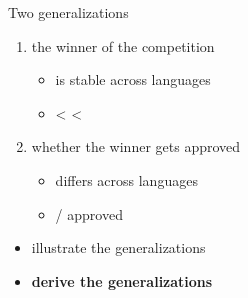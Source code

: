 \documentclass[xcolor=dvipsnames,10pt]{beamer}
\begin{document}
\begin{frame}[t]{Two generalizations}

\begin{enumerate}
  \item the winner of the competition
  \begin{itemize}
      \item is stable across languages
      \item {} <  < 
  \end{itemize}
  \item whether the winner gets approved
  \begin{itemize}
      \item differs across languages
      \item {}/ approved
  \end{itemize}
\end{enumerate}

\vspace{1em}

\begin{itemize}
  \item illustrate the generalizations
  \item \textbf<2>{derive the generalizations}
\end{itemize}

\end{frame}
\end{document}
